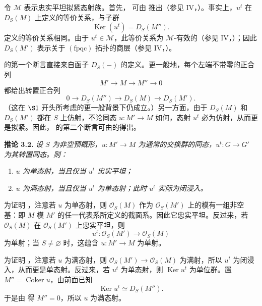 令 \(\mathcal M\) 表示忠实平坦拟紧态射族。首先， 可由  推出（参见 IV，）。事实上，\(u^t\) 在 \(D_S(M)\) 上定义的等价关系，与子群
\[
  \operatorname{Ker}(u^t)=D_S(M'').
\]
定义的等价关系相同。由于 \(u^t\in\mathcal M\)，此等价关系为 \(\mathcal M\)-有效的（参见 IV，）；因此 \(D_S(M')\) 表示关于 \((\mathrm{fpqc})\) 拓扑的商层（参见 IV，）。

 的第一个断言直接来自函子 \(D_S(-)\) 的定义。更一般地，每个左端不带零的正合列
\[
  M'\longrightarrow M\longrightarrow M''\longrightarrow0
\]
都给出转置正合列
\[
  0\longrightarrow D_S(M'')
   \longrightarrow D_S(M)
   \longrightarrow D_S(M').
\]
（这在 \(\SGARefLink{sga3:viii:section:1}{\S1}\) 开头所考虑的更一般背景下仍成立。）另一方面，由于 \(D_S(M)\) 和 \(D_S(M')\) 都在 \(S\) 上仿射，不论同态 \(u:M'\to M\) 如何，态射 \(u^t\) 必为仿射，从而更是拟紧。因此， 的第二个断言可由的得出。

\medskip
\noindent{}\textbf{推论 3.2.}
\textit{设 \(S\) 为非空预概形，\(u:M'\to M\) 为通常的交换群的同态，\(u^t:G\to G'\) 为其转置同态。则：}
\begin{enumerate}
  \item[(a)]
  \textit{\(u\) 为单态射，当且仅当 \(u^t\) 忠实平坦；}

  \item[(b)]
  \textit{\(u\) 为满态射，当且仅当 \(u^t\) 为单态射；此时 \(u^t\) 实际为闭浸入。}
\end{enumerate}

为证明 ，注意若 \(u\) 为单态射，则 \(\mathcal O_S(M)\) 作为 \(\mathcal O_S(M')\) 上的模有一组非空基：即 \(M\) 模 \(M'\) 的任一代表系所定义的截面系。因此它忠实平坦。反过来，若 \(\mathcal O_S(M)\) 在 \(\mathcal O_S(M')\) 上忠实平坦，则
\[
  u^t:\mathcal O_S(M')\longrightarrow\mathcal O_S(M)
\]
为单射；当 \(S\ne\varnothing\) 时，这蕴含 \(u:M'\to M\) 为单射。

为证明 ，注意若 \(u\) 为满态射，则 \(\mathcal O_S(M')\to\mathcal O_S(M)\) 为满射，所以 \(u^t\) 为闭浸入，从而更是单态射。反过来，若 \(u^t\) 为单态射，则 \(\operatorname{Ker}u^t\) 为单位群。置 \(M''=\operatorname{Coker}u\)，由前面已知
\[
  \operatorname{Ker}u^t\simeq D_S(M'').
\]
于是由  得 \(M''=0\)，所以 \(u\) 为满态射。

